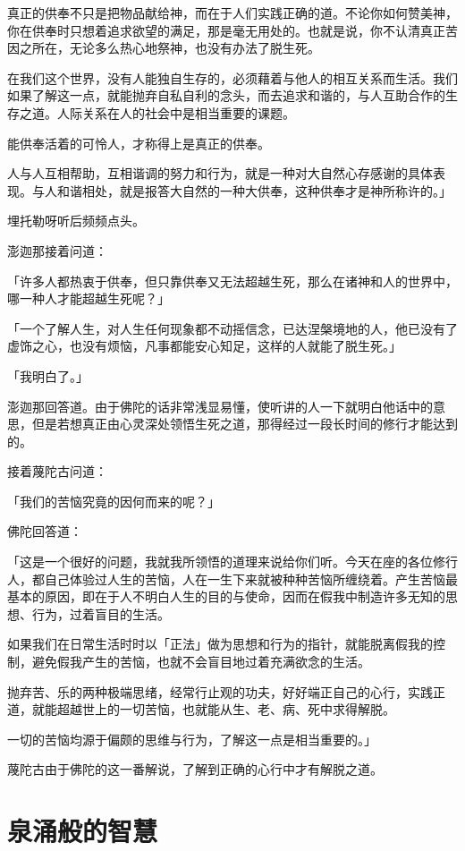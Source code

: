 \documentclass[twoside,openany]{book}
\begin{document}
真正的供奉不只是把物品献给神，而在于人们实践正确的道。不论你如何赞美神，你在供奉时只想着追求欲望的满足，那是毫无用处的。也就是说，你不认清真正苦因之所在，无论多么热心地祭神，也没有办法了脱生死。

在我们这个世界，没有人能独自生存的，必须藉着与他人的相互关系而生活。我们如果了解这一点，就能抛弃自私自利的念头，而去追求和谐的，与人互助合作的生存之道。人际关系在人的社会中是相当重要的课题。

能供奉活着的可怜人，才称得上是真正的供奉。

人与人互相帮助，互相谐调的努力和行为，就是一种对大自然心存感谢的具体表现。与人和谐相处，就是报答大自然的一种大供奉，这种供奉才是神所称许的。」

埋托勒呀听后频频点头。

澎迦那接着问道：

「许多人都热衷于供奉，但只靠供奉又无法超越生死，那么在诸神和人的世界中，哪一种人才能超越生死呢？」

「一个了解人生，对人生任何现象都不动摇信念，已达涅槃境地的人，他已没有了虚饰之心，也没有烦恼，凡事都能安心知足，这样的人就能了脱生死。」

「我明白了。」

澎迦那回答道。由于佛陀的话非常浅显易懂，使听讲的人一下就明白他话中的意思，但是若想真正由心灵深处领悟生死之道，那得经过一段长时间的修行才能达到的。

接着蔑陀古问道：

「我们的苦恼究竟的因何而来的呢？」

佛陀回答道：

「这是一个很好的问题，我就我所领悟的道理来说给你们听。今天在座的各位修行人，都自己体验过人生的苦恼，人在一生下来就被种种苦恼所缠绕着。产生苦恼最基本的原因，即在于人不明白人生的目的与使命，因而在假我中制造许多无知的思想、行为，过着盲目的生活。

如果我们在日常生活时时以「正法」做为思想和行为的指针，就能脱离假我的控制，避免假我产生的苦恼，也就不会盲目地过着充满欲念的生活。

抛弃苦、乐的两种极端思绪，经常行止观的功夫，好好端正自己的心行，实践正道，就能超越世上的一切苦恼，也就能从生、老、病、死中求得解脱。

一切的苦恼均源于偏颇的思维与行为，了解这一点是相当重要的。」

蔑陀古由于佛陀的这一番解说，了解到正确的心行中才有解脱之道。

\section{泉涌般的智慧}\label{sec5.3}
\end{document}

